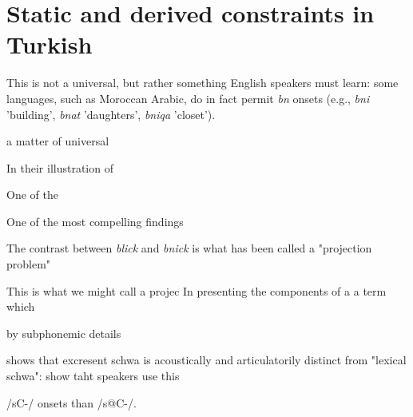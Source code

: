 \chapter{Static and derived constraints in Turkish}
\label{turkish}



This is not a universal, but rather something English speakers must learn: some languages, such as Moroccan Arabic, do in fact permit \emph{bn} onsets (e.g., \emph{bni} 'building', \emph{bnat} 'daughters', \emph{bniqa} 'closet'). 


a matter of universal

In their illustration of 

One of the 

One of the most compelling findings 

The contrast between \emph{blick} and \emph{bnick} is what has been called a "projection problem" \citep{Baker1979}

This is what we might call a projec
In presenting the components of a 
a term which 

by subphonemic details

\citet{Davidson2005,Davidson2006a} shows that excresent schwa is acoustically and articulatorily distinct from "lexical schwa":
\citet{Wilson2011} show taht speakers use this 


/sC-/ onsets than /s@C-/.



\citet{Berent2007a}
\citet{Berent2007b}
\citet{Berent2008a}

\citet{Peperkamp2007}
\citet{Dupoux1999}

